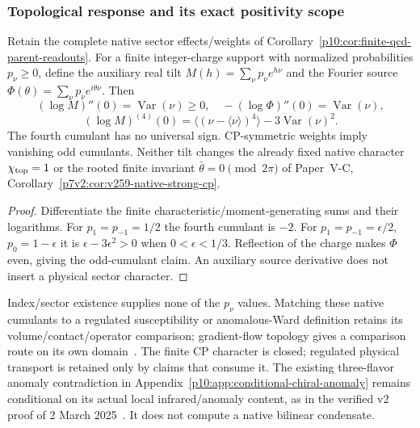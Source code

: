 \documentclass[12pt,a4paper]{article}
\begin{document}
\subsubsection{Topological response and its exact positivity scope}
\begin{theorem}
\label{p10:thm:v2210-lit-sector-cumulants}
Retain the complete native sector effects/weights of
Corollary~\ref{p10:cor:finite-qcd-parent-readouts}. For a finite integer-charge
support with normalized probabilities $p_\nu\ge0$, define the auxiliary
real tilt $M(h)=\sum_\nu p_\nu e^{h\nu}$ and the Fourier source
$\Phi(\theta)=\sum_\nu p_\nu e^{i\theta\nu}$. Then
\[
 (\log M)''(0)=\operatorname{Var}(\nu)\ge0,
 \quad -(\log\Phi)''(0)=\operatorname{Var}(\nu),
\]
\[
 (\log M)^{(4)}(0)
 =\langle(\nu-\langle\nu\rangle)^4\rangle
       -3\operatorname{Var}(\nu)^2.
\]
The fourth cumulant has no universal sign. CP-symmetric weights imply
vanishing odd cumulants. Neither tilt changes the already fixed native
 character $\chi_{\rm top}=1$ or the rooted finite invariant
$\bar\theta=0\pmod{2\pi}$ of Paper~V-C,
Corollary~\ref{p7v2:cor:v259-native-strong-cp}.
\end{theorem}
\begin{proof}
Differentiate the finite characteristic/moment-generating sums and their
logarithms. For $p_1=p_{-1}=1/2$ the fourth cumulant is $-2$.
For $p_1=p_{-1}=\epsilon/2$, $p_0=1-\epsilon$ it is
$\epsilon-3\epsilon^2>0$ when $0<\epsilon<1/3$.
Reflection of the charge makes $\Phi$ even, giving the odd-cumulant claim.
An auxiliary source derivative does not insert a physical sector character.
\end{proof}
Index/sector existence supplies none of the $p_\nu$ values. Matching these
native cumulants to a regulated susceptibility or anomalous-Ward definition
retains its volume/contact/operator comparison; gradient-flow topology gives
a comparison route on its own domain~\cite{LitQCDCe2015Topological}.
The finite CP character is closed; regulated physical transport is retained
only by claims that consume it. The existing three-flavor anomaly
contradiction in Appendix~\ref{p10:app:conditional-chiral-anomaly} remains
conditional on its actual local infrared/anomaly content, as in the verified
v2 proof of 2 March 2025~\cite{CiambrielloEtAl2024ChiralStrategy}. It does not compute a native
bilinear condensate.


\begingroup
\small
\RaggedRight
\setlength{\emergencystretch}{10em}
\sloppy
\endgroup
\end{document}
